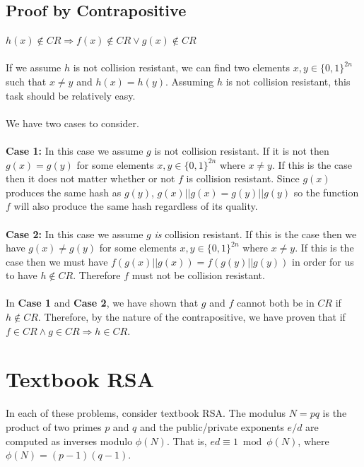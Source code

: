 \documentclass[12pt, letterpaper]{article}
\begin{document}
\subsection{Proof by Contrapositive}
$h(x) \notin CR \Rightarrow f(x) \notin CR \lor g(x) \notin CR$
~\\~\\
If we assume $h$ is not collision resistant, we can find two elements $x, y \in \{0, 1\}^{2n}$ such that $x \neq y$ and $h(x) = h(y)$. Assuming $h$ is not collision resistant, this task should be relatively easy. 
~\\~\\
We have two cases to consider.
~\\~\\
\textbf{Case 1:}
In this case we assume $g$ is not collision resistant. If it is not then $g(x) = g(y)$ for some elements $x, y \in \{0, 1\}^{2n}$ where $x \neq y$. If this is the case then it does not matter whether or not $f$ is collision resistant. Since $g(x)$ produces the same hash as $g(y)$, $g(x)||g(x) = g(y)||g(y)$ so the function $f$ will also produce the same hash regardless of its quality. 
~\\~\\
\textbf{Case 2:}
In this case we assume $g$ \textit{is} collision resistant. If this is the case then we have $g(x) \neq g(y)$ for some elements $x, y \in \{0, 1\}^{2n}$ where $x \neq y$. If this is the case then we must have $f(g(x)||g(x)) = f(g(y)||g(y))$ in order for us to have $h \notin CR$. Therefore $f$ must not be collision resistant.
~\\~\\
In \textbf{Case 1} and \textbf{Case 2}, we have shown that $g$ and $f$ cannot both be in $CR$ if $h \notin CR$. Therefore, by the nature of the contrapositive, we have proven that if $f \in CR \land g \in CR \Rightarrow h \in CR$.

\newpage

\section{Textbook RSA}

In each of these problems, consider textbook RSA.  
The modulus $N = pq$ is the product of two primes $p$ and $q$ and the public/private exponents $e/d$ are computed
as inverses modulo $\phi(N)$.  That is, $ed \equiv 1 \bmod {\phi(N)}$, where $\phi(N) = (p-1)(q-1)$.
\end{document}
